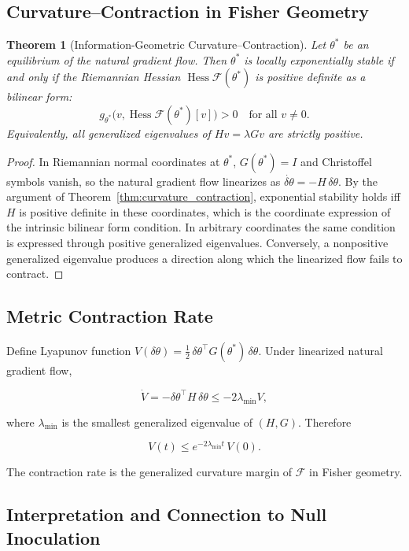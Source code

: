 \documentclass[11pt]{article}
\newtheorem{theorem}{Theorem}
\theoremstyle{remark}
\begin{document}
\subsection{Curvature--Contraction in Fisher Geometry}

\begin{theorem}[Information-Geometric Curvature--Contraction]
\label{thm:info_curvature_contraction}
Let $\theta^*$ be an equilibrium of the natural gradient flow. Then $\theta^*$ is locally exponentially stable if and only if the Riemannian Hessian $\operatorname{Hess}\mathcal{F}(\theta^*)$ is positive definite as a bilinear form:
\[
g_{\theta^*}\big(v,\operatorname{Hess}\mathcal{F}(\theta^*)[v]\big) > 0
\quad \text{for all } v \neq 0.
\]
Equivalently, all generalized eigenvalues of $H v = \lambda G v$ are strictly positive.
\end{theorem}

\begin{proof}
In Riemannian normal coordinates at $\theta^*$, $G(\theta^*) = I$ and Christoffel symbols vanish, so the natural gradient flow linearizes as $\dot{\delta\theta} = -H\,\delta\theta$. By the argument of Theorem~\ref{thm:curvature_contraction}, exponential stability holds iff $H$ is positive definite in these coordinates, which is the coordinate expression of the intrinsic bilinear form condition. In arbitrary coordinates the same condition is expressed through positive generalized eigenvalues. Conversely, a nonpositive generalized eigenvalue produces a direction along which the linearized flow fails to contract.
\end{proof}

\subsection{Metric Contraction Rate}

Define Lyapunov function $V(\delta\theta) = \frac{1}{2}\,\delta\theta^\top G(\theta^*)\,\delta\theta$. Under linearized natural gradient flow,

\[
\dot{V}
=
-\delta\theta^\top H\,\delta\theta
\le
-2\lambda_{\min} V,
\]

where $\lambda_{\min}$ is the smallest generalized eigenvalue of $(H, G)$. Therefore

\[
V(t) \le e^{-2\lambda_{\min} t}\,V(0).
\]

The contraction rate is the generalized curvature margin of $\mathcal{F}$ in Fisher geometry.

\subsection{Interpretation and Connection to Null Inoculation}
\end{document}
